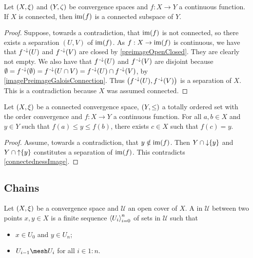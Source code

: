 \begin{proposition} \label{connectednessImage}
Let $\sSet{X,\xi}$ and $\sSet{Y,\zeta}$ be convergence spaces and $f:X\to Y$ a continuous function. If $X$ is connected, then $\operatorname{im}(f)$ is a connected subspace of $Y$.
\end{proposition}
\begin{proof}
Suppose, towards a contradiction, that $\operatorname{im}(f)$ is not connected, so there exists a separation $(U,V)$ of $\operatorname{im}(f)$. As $f: X\to \operatorname{im}(f)$ is continuous, we have that $f^{\text{\hspace{0.15em}-}\downarrow}(U)$ and $f^{{\text{\hspace{0.15em}-}\downarrow}}(V)$ are closed by \ref{preimageOpenClosed}. They are clearly not empty. We also have that $f^{\text{\hspace{0.15em}-}\downarrow}(U)$ and $f^{{\text{\hspace{0.15em}-}\downarrow}}(V)$ are disjoint because $\emptyset = f^{\text{\hspace{0.15em}-}\downarrow}(\emptyset) = f^{\text{\hspace{0.15em}-}\downarrow}(U\cap V) = f^{\text{\hspace{0.15em}-}\downarrow}(U)\cap f^{\text{\hspace{0.15em}-}\downarrow}(V)$, by \ref{imagePreimageGaloisConnection}. Thus $\big(f^{\text{\hspace{0.15em}-}\downarrow}(U), f^{\text{\hspace{0.15em}-}\downarrow}(V)\big)$ is a separation of $X$. This is a contradiction because $X$ was assumed connected.
\end{proof}

\begin{proposition} \label{generalisedIntermediateValueTheorem}
Let $\sSet{X,\xi}$ be a connected convergence space, $\sSet{Y, \leq}$ a totally ordered set with the order convergence and $f: X\to Y$ a continuous function. For all $a,b\in X$ and $y\in Y$ such that $f(a) \leq y \leq f(b)$, there exists $c\in X$ such that $f(c) = y$.
\end{proposition}
\begin{proof}
Assume, towards a contradiction, that $y\notin \operatorname{im}(f)$. Then $Y\cap \operatorname{\downarrow} \{y\}$ and $Y\cap \operatorname{\uparrow} \{y\}$ constitutes a separation of $\operatorname{im}(f)$. This contradicts \ref{connectednessImage}.
\end{proof}

\subsection{Chains}
\begin{definition}
Let $\sSet{X,\xi}$ be a convergence space and $\mathcal{U}$ an open cover of $X$. A  in $\mathcal{U}$ between two points $x,y\in X$ is a finite sequence $\left\langle U_i \right\rangle_{i=0}^n$ of sets in $\mathcal{U}$ such that
\begin{itemize}
\item $x\in U_0$ and $y\in U_n$;
\item $U_{i-1}\mesh U_i$ for all $i\in 1:n$.
\end{itemize}
\end{definition}

